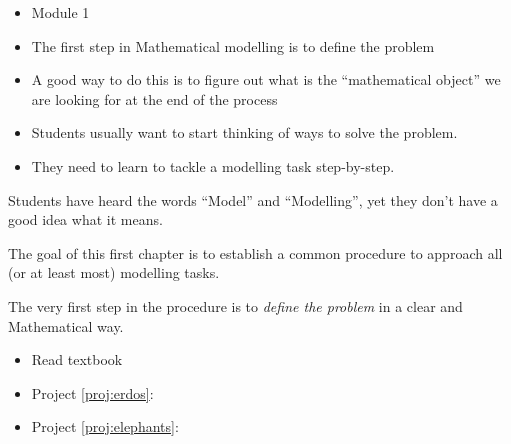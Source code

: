 \begin{lesson}

	
	\begin{itemize}
		\item Module 1
	\end{itemize}

	\begin{itemize}
		\item The first step in Mathematical modelling is to define the problem
		\item A good way to do this is to figure out what is the ``mathematical object'' we are looking for at the end of the process

	\end{itemize}
	

\begin{annotation}
\begin{notes}
\begin{itemize}
	\item Students usually want to start thinking of ways to solve the problem.
	
	\item They need to learn to tackle a modelling task step-by-step.
\end{itemize}
\end{notes}	
\end{annotation}

Students have heard the words ``Model'' and ``Modelling'', yet they don't have a good idea what it means. 

The goal of this first chapter is to establish a common procedure to approach all  (or at least most) modelling tasks. 

The very first step in the procedure is to \emph{define the problem} in a clear and Mathematical way.

\begin{itemize}
	\item Read textbook
\end{itemize}


\begin{itemize}
	\item Project \ref{proj:erdos}: \erdostitle
	\item Project \ref{proj:elephants}: \elephantstitle
\end{itemize}


\end{lesson}
